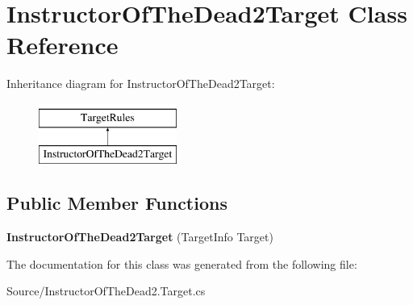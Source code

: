 \hypertarget{class_instructor_of_the_dead2_target}{}\section{Instructor\+Of\+The\+Dead2\+Target Class Reference}
\label{class_instructor_of_the_dead2_target}
Inheritance diagram for Instructor\+Of\+The\+Dead2\+Target\+:\begin{figure}[H]
\begin{center}
\leavevmode
\includegraphics[height=2.000000cm]{class_instructor_of_the_dead2_target}
\end{center}
\end{figure}
\subsection*{Public Member Functions}
\begin{DoxyCompactItemize}
\item 
\mbox{\label{class_instructor_of_the_dead2_target_a3be2fedb24e2765cb7f9bee24a5231ff}} 
{\bfseries Instructor\+Of\+The\+Dead2\+Target} (Target\+Info Target)
\end{DoxyCompactItemize}


The documentation for this class was generated from the following file\+:\begin{DoxyCompactItemize}
\item 
Source/Instructor\+Of\+The\+Dead2.\+Target.\+cs\end{DoxyCompactItemize}
